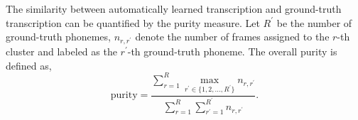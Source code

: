 \documentclass[a4paper]{article}
\begin{document}
The similarity between automatically learned transcription and ground-truth transcription can be quantified by the purity measure. 
Let $R^{\prime}$ be the number of ground-truth phonemes, $n_{r, r^{\prime}}$ denote the number of frames assigned to the $r$-th cluster and labeled as the $r^{\prime}$-th ground-truth phoneme. The overall purity is defined as,
\begin{equation}
\mathrm{purity} = \frac{\sum\limits_{r=1}^{R}\max\limits_{r^{\prime} \in \{1,2,...,R^{\prime}\}}n_{r, r^{\prime}}}{\sum\limits_{r=1}^{R} \sum\limits_{r^{\prime}=1}^{R^{\prime}}n_{r, r^{\prime}}}.
\end{equation}
\end{document}
